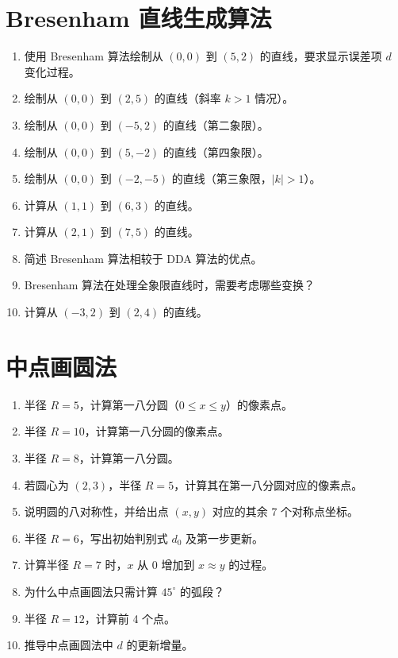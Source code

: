 \documentclass[UTF8]{ctexart}
\begin{document}
\section{Bresenham 直线生成算法}
\begin{enumerate}
    \item 使用 Bresenham 算法绘制从 $(0,0)$ 到 $(5,2)$ 的直线，要求显示误差项 $d$ 变化过程。
    \item 绘制从 $(0,0)$ 到 $(2,5)$ 的直线（斜率 $k > 1$ 情况）。
    \item 绘制从 $(0,0)$ 到 $(-5,2)$ 的直线（第二象限）。
    \item 绘制从 $(0,0)$ 到 $(5,-2)$ 的直线（第四象限）。
    \item 绘制从 $(0,0)$ 到 $(-2,-5)$ 的直线（第三象限，$|k| > 1$）。
    \item 计算从 $(1,1)$ 到 $(6,3)$ 的直线。
    \item 计算从 $(2,1)$ 到 $(7,5)$ 的直线。
    \item 简述 Bresenham 算法相较于 DDA 算法的优点。
    \item Bresenham 算法在处理全象限直线时，需要考虑哪些变换？
    \item 计算从 $(-3,2)$ 到 $(2,4)$ 的直线。
\end{enumerate}

\section{中点画圆法}
\begin{enumerate}
    \item 半径 $R=5$，计算第一八分圆（$0 \le x \le y$）的像素点。
    \item 半径 $R=10$，计算第一八分圆的像素点。
    \item 半径 $R=8$，计算第一八分圆。
    \item 若圆心为 $(2,3)$，半径 $R=5$，计算其在第一八分圆对应的像素点。
    \item 说明圆的八对称性，并给出点 $(x,y)$ 对应的其余 7 个对称点坐标。
    \item 半径 $R=6$，写出初始判别式 $d_0$ 及第一步更新。
    \item 计算半径 $R=7$ 时，$x$ 从 $0$ 增加到 $x \approx y$ 的过程。
    \item 为什么中点画圆法只需计算 $45^\circ$ 的弧段？
    \item 半径 $R=12$，计算前 4 个点。
    \item 推导中点画圆法中 $d$ 的更新增量。
\end{enumerate}
\end{document}
